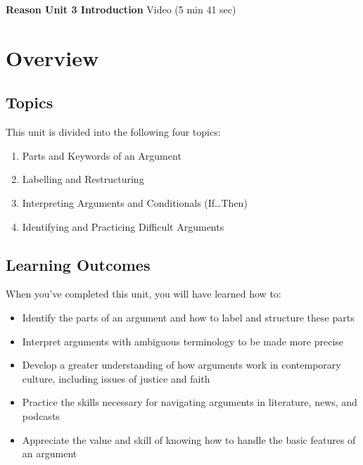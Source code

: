 \documentclass[
]{book}
\providecommand{\tightlist}{%
  \setlength{\itemsep}{0pt}\setlength{\parskip}{0pt}}
\begin{document}
\textbf{Reason Unit 3 Introduction} Video (5 min 41 sec)

\hypertarget{overview-2}{%
\section*{Overview}\label{overview-2}}

\hypertarget{topics-2}{%
\subsection*{Topics}\label{topics-2}}

This unit is divided into the following four topics:

\begin{enumerate}
\def\labelenumi{\arabic{enumi}.}
\tightlist
\item
  Parts and Keywords of an Argument
\item
  Labelling and Restructuring
\item
  Interpreting Arguments and Conditionals (If\ldots Then)
\item
  Identifying and Practicing Difficult Arguments
\end{enumerate}

\hypertarget{learning-outcomes-2}{%
\subsection*{Learning Outcomes}\label{learning-outcomes-2}}

When you've completed this unit, you will have learned how to:

\begin{itemize}
\tightlist
\item
  Identify the parts of an argument and how to label and structure these parts
\item
  Interpret arguments with ambiguous terminology to be made more precise
\item
  Develop a greater understanding of how arguments work in contemporary culture, including issues of justice and faith
\item
  Practice the skills necessary for navigating arguments in literature, news, and podcasts
\item
  Appreciate the value and skill of knowing how to handle the basic features of an argument
\end{itemize}
\end{document}
